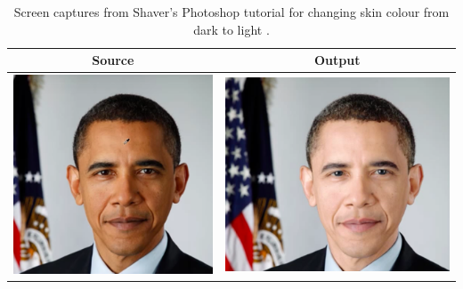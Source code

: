 \begin{table}[H]
    \centering
    \caption{Screen captures from Shaver's Photoshop tutorial for changing skin colour from dark to light \cite{photoshop:obama}. \label{tab:obama_demo}}
\begin{tabular}{|c|c|}
    \hline
    Source & Output \\
    \hline
  \begin{minipage}{.29\textwidth}
    \includegraphics[width=\textwidth,height=\textheight,keepaspectratio]{images/obama_orig}
  \end{minipage} & 
  \begin{minipage}{.29\textwidth}
    \includegraphics[width=\textwidth,height=\textheight,keepaspectratio]{images/obama_res}
  \end{minipage} \\
    \hline
\end{tabular}
\end{table}

